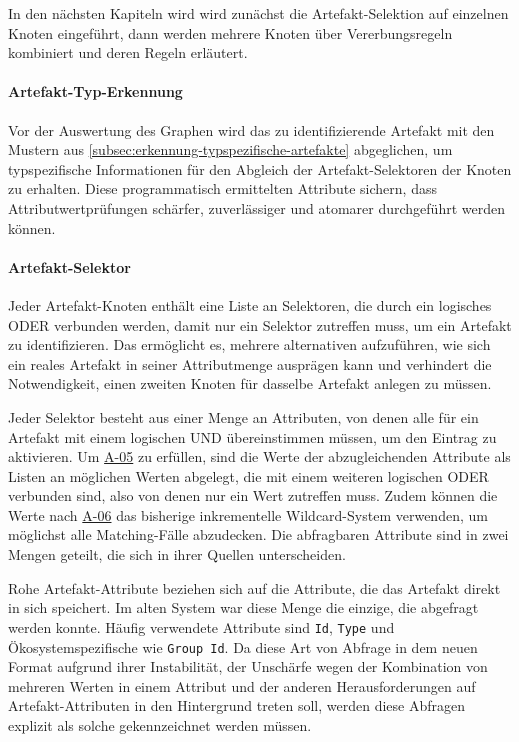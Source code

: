 In den nächsten Kapiteln wird wird zunächst die Artefakt-Selektion auf einzelnen Knoten eingeführt, dann werden mehrere Knoten über Vererbungsregeln kombiniert und deren Regeln erläutert.

\paragraph{Artefakt-Typ-Erkennung}

Vor der Auswertung des Graphen wird das zu identifizierende Artefakt mit den Mustern aus \autoref{subsec:erkennung-typspezifische-artefakte} abgeglichen, um typspezifische Informationen für den Abgleich der Artefakt-Selektoren der Knoten zu erhalten.
Diese programmatisch ermittelten Attribute sichern, dass Attributwertprüfungen schärfer, zuverlässiger und atomarer durchgeführt werden können.

\paragraph{Artefakt-Selektor}

Jeder Artefakt-Knoten enthält eine Liste an Selektoren, die durch ein logisches ODER verbunden werden, damit nur ein Selektor zutreffen muss, um ein Artefakt zu identifizieren.
Das ermöglicht es, mehrere alternativen aufzuführen, wie sich ein reales Artefakt in seiner Attributmenge ausprägen kann und verhindert die Notwendigkeit, einen zweiten Knoten für dasselbe Artefakt anlegen zu müssen.

Jeder Selektor besteht aus einer Menge an Attributen, von denen alle für ein Artefakt mit einem logischen UND übereinstimmen müssen, um den Eintrag zu aktivieren.
Um \hyperref[subsec:req-multiple-attribute-values]{A-05} zu erfüllen, sind die Werte der abzugleichenden Attribute als Listen an möglichen Werten abgelegt, die mit einem weiteren logischen ODER verbunden sind, also von denen nur ein Wert zutreffen muss.
Zudem können die Werte nach \hyperref[subsec:req-regex-support]{A-06} das bisherige inkrementelle Wildcard-System verwenden, um möglichst alle Matching-Fälle abzudecken.
Die abfragbaren Attribute sind in zwei Mengen geteilt, die sich in ihrer Quellen unterscheiden.

Rohe Artefakt-Attribute beziehen sich auf die Attribute, die das Artefakt direkt in sich speichert.
Im alten System war diese Menge die einzige, die abgefragt werden konnte.
Häufig verwendete Attribute sind \texttt{Id}, \texttt{Type} und Ökosystemspezifische wie \texttt{Group Id}.
Da diese Art von Abfrage in dem neuen Format aufgrund ihrer Instabilität, der Unschärfe wegen der Kombination von mehreren Werten in einem Attribut und der anderen Herausforderungen auf Artefakt-Attributen in den Hintergrund treten soll, werden diese Abfragen explizit als solche gekennzeichnet werden müssen.

